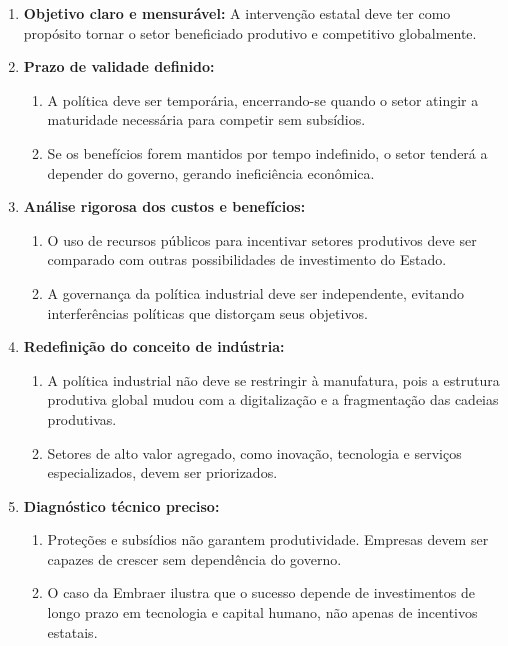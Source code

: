 \documentclass[a4paper,12pt]{article}[abntex2]
\begin{document}
\begin{enumerate}
    \item \textbf{Objetivo claro e mensurável:}  
    A intervenção estatal deve ter como propósito tornar o setor beneficiado produtivo e competitivo globalmente.

    \item \textbf{Prazo de validade definido:}  
    \begin{enumerate}
        \item A política deve ser temporária, encerrando-se quando o setor atingir a maturidade necessária para competir sem subsídios.
        \item Se os benefícios forem mantidos por tempo indefinido, o setor tenderá a depender do governo, gerando ineficiência econômica.
    \end{enumerate}

    \item \textbf{Análise rigorosa dos custos e benefícios:}  
    \begin{enumerate}
        \item O uso de recursos públicos para incentivar setores produtivos deve ser comparado com outras possibilidades de investimento do Estado.
        \item A governança da política industrial deve ser independente, evitando interferências políticas que distorçam seus objetivos.
    \end{enumerate}

    \item \textbf{Redefinição do conceito de indústria:}  
    \begin{enumerate}
        \item A política industrial não deve se restringir à manufatura, pois a estrutura produtiva global mudou com a digitalização e a fragmentação das cadeias produtivas.
        \item Setores de alto valor agregado, como inovação, tecnologia e serviços especializados, devem ser priorizados.
    \end{enumerate}

    \item \textbf{Diagnóstico técnico preciso:}  
    \begin{enumerate}
        \item Proteções e subsídios não garantem produtividade. Empresas devem ser capazes de crescer sem dependência do governo.
        \item O caso da Embraer ilustra que o sucesso depende de investimentos de longo prazo em tecnologia e capital humano, não apenas de incentivos estatais.
    \end{enumerate}


\end{enumerate}
\end{document}

